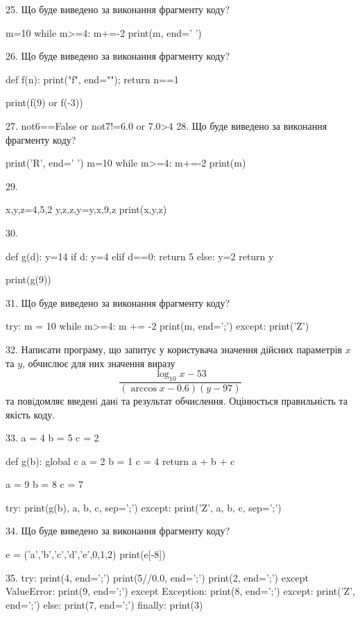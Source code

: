 \documentclass[11pt]{article}
\begin{document}
25. Що буде виведено за виконання фрагменту коду?

m=10
while m>=4:
    m+=-2
print(m, end=' ')


26. Що буде виведено за виконання фрагменту коду?

def f(n):
    print("f", end="");
    return n==1

print(f(9) or f(-3))

27. 
not6==False or not7!=6.0 or 7.0>4
28. Що буде виведено за виконання фрагменту коду?

print('R', end=' ')
m=10
while m>=4:
    m+=-2
print(m)


29. 

x,y,z=4,5,2
y,z,z,y=y,x,9,z
print(x,y,z)

30. 

def g(d):
    y=14
    if d: 
        y=4
    elif d==0:
         return 5
    else:
         y=2
    return y

print(g(9))

31. Що буде виведено за виконання фрагменту коду?

try:
    m = 10
    while m>=4:
        m += -2
    print(m, end=';')
except:
    print('Z')


32. 
Написати програму, що запитує у користувача значення дійсних параметрів $x$ та $y$, обчислює для них значення виразу 
$$\frac{\log_{10} x - 53}{(\arccos x - 0.6) (y - 97)}$$ 
та повiдомляє введенi данi та результат обчислення.
 Оцінюється правильність та якість коду.


33. 
a = 4
b = 5
c = 2

def g(b):
global c    a = 2
    b = 1
    c = 4
    return a + b + c

a = 9
b = 8
c = 7

try:
    print(g(b), a, b, c, sep=';')
except:
    print('Z', a, b, c, sep=';')

34. Що буде виведено за виконання фрагменту коду?

e = ('a','b','c','d','e',0,1,2)
print(e[-8])


35. 
try:
    print(4, end=';')
    print(5//0.0, end=';')
    print(2, end=';')
except ValueError:
    print(9, end=';')
except Exception:
    print(8, end=';')
except:
    print('Z', end=';')
else:
    print(7, end=';')
finally:
    print(3)
\end{document}
